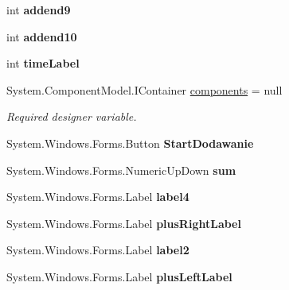 \begin{DoxyCompactItemize}
int {\bfseries addend9}
\item 
\mbox{\label{class_quiz___matematyczny_1_1_dodawanie_a37b77e594108b39e7e26fc30f24c6ad4}} 
int {\bfseries addend10}
\item 
\mbox{\label{class_quiz___matematyczny_1_1_dodawanie_a5ca26122289c61e7c1849715df831c56}} 
int {\bfseries time\+Label}
\item 
System.\+Component\+Model.\+I\+Container \mbox{\hyperlink{class_quiz___matematyczny_1_1_dodawanie_a1c9357c43c148c2c573b918b8d8211a6}{components}} = null
\begin{DoxyCompactList}\small\item\em Required designer variable. \end{DoxyCompactList}\item 
\mbox{\label{class_quiz___matematyczny_1_1_dodawanie_a26ae3670c01729bc74e1478c4f3a2496}} 
System.\+Windows.\+Forms.\+Button {\bfseries Start\+Dodawanie}
\item 
\mbox{\label{class_quiz___matematyczny_1_1_dodawanie_a7082b82a8b5ce3feecf1350901e18930}} 
System.\+Windows.\+Forms.\+Numeric\+Up\+Down {\bfseries sum}
\item 
\mbox{\label{class_quiz___matematyczny_1_1_dodawanie_aaaf41ec676622524b679ccdb0bd97dd4}} 
System.\+Windows.\+Forms.\+Label {\bfseries label4}
\item 
\mbox{\label{class_quiz___matematyczny_1_1_dodawanie_a69cd1d9991382723124ed319be9cb8c1}} 
System.\+Windows.\+Forms.\+Label {\bfseries plus\+Right\+Label}
\item 
\mbox{\label{class_quiz___matematyczny_1_1_dodawanie_a76bcf855adc36d072aae5f3c92a4f414}} 
System.\+Windows.\+Forms.\+Label {\bfseries label2}
\item 
\mbox{\label{class_quiz___matematyczny_1_1_dodawanie_ab6c78ffe0f47cd92f188757e6eb66071}} 
System.\+Windows.\+Forms.\+Label {\bfseries plus\+Left\+Label}

\end{DoxyCompactItemize}
